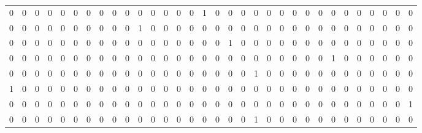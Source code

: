 \begin{tabular}{rrrrrrrrrrrrrrrrrrrrrrrrrrrrrrrr}
       0 &       0 &       0 &       0 &       0 &       0 &       0 &       0 &       0 &       0 &       0 &       0 &       0 &       0 &       0 &       1 &       0 &       0 &       0 &       0 &       0 &       0 &       0 &       0 &       0 &       0 &       0 &       0 &       0 &       0 &       0 &       0 \\
       0 &       0 &       0 &       0 &       0 &       0 &       0 &       0 &       0 &       0 &       1 &       0 &       0 &       0 &       0 &       0 &       0 &       0 &       0 &       0 &       0 &       0 &       0 &       0 &       0 &       0 &       0 &       0 &       0 &       0 &       0 &       0 \\
       0 &       0 &       0 &       0 &       0 &       0 &       0 &       0 &       0 &       0 &       0 &       0 &       0 &       0 &       0 &       0 &       0 &       1 &       0 &       0 &       0 &       0 &       0 &       0 &       0 &       0 &       0 &       0 &       0 &       0 &       0 &       0 \\
       0 &       0 &       0 &       0 &       0 &       0 &       0 &       0 &       0 &       0 &       0 &       0 &       0 &       0 &       0 &       0 &       0 &       0 &       0 &       0 &       0 &       0 &       0 &       0 &       0 &       1 &       0 &       0 &       0 &       0 &       0 &       0 \\
       0 &       0 &       0 &       0 &       0 &       0 &       0 &       0 &       0 &       0 &       0 &       0 &       0 &       0 &       0 &       0 &       0 &       0 &       0 &       1 &       0 &       0 &       0 &       0 &       0 &       0 &       0 &       0 &       0 &       0 &       0 &       0 \\
       1 &       0 &       0 &       0 &       0 &       0 &       0 &       0 &       0 &       0 &       0 &       0 &       0 &       0 &       0 &       0 &       0 &       0 &       0 &       0 &       0 &       0 &       0 &       0 &       0 &       0 &       0 &       0 &       0 &       0 &       0 &       0 \\
       0 &       0 &       0 &       0 &       0 &       0 &       0 &       0 &       0 &       0 &       0 &       0 &       0 &       0 &       0 &       0 &       0 &       0 &       0 &       0 &       0 &       0 &       0 &       0 &       0 &       0 &       0 &       0 &       0 &       0 &       0 &       1 \\
       0 &       0 &       0 &       0 &       0 &       0 &       0 &       0 &       0 &       0 &       0 &       0 &       0 &       0 &       0 &       0 &       0 &       0 &       0 &       1 &       0 &       0 &       0 &       0 &       0 &       0 &       0 &       0 &       0 &       0 &       0 &       0 \\

\end{tabular}
